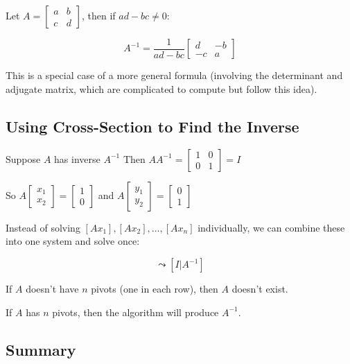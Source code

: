 \documentclass[12pt,a4paper]{article}
\begin{document}
Let $A = \begin{bmatrix} a & b \\ c & d \end{bmatrix}$, then if $ad-bc \neq 0$:

\begin{equation}
    A^{-1} = \frac{1}{ad-bc} \begin{bmatrix} d & -b \\ -c & a \end{bmatrix}
\end{equation}

This is a special case of a more general formula (involving the determinant and adjugate matrix, which are complicated to compute but follow this idea).

\subsection{Using Cross-Section to Find the Inverse}

Suppose $A$ has inverse $A^{-1}$
Then $AA^{-1} = \begin{bmatrix} 1 & 0 \\ 0 & 1 \end{bmatrix} = I$

So $A \begin{bmatrix} x_1 \\ x_2 \end{bmatrix} = \begin{bmatrix} 1 \\ 0 \end{bmatrix}$ and $A \begin{bmatrix} y_1 \\ y_2 \end{bmatrix} = \begin{bmatrix} 0 \\ 1 \end{bmatrix}$

Instead of solving $[Ax_1], [Ax_2], \ldots, [Ax_n]$ individually, we can combine these into one system and solve once:

\begin{equation}
    [A|e_1, e_2, \ldots, e_n] \leadsto [I|A^{-1}]
\end{equation}

If $A$ doesn't have $n$ pivots (one in each row), then $A$ doesn't exist.

If $A$ has $n$ pivots, then the algorithm will produce $A^{-1}$.

\subsection{Summary}
\end{document}
